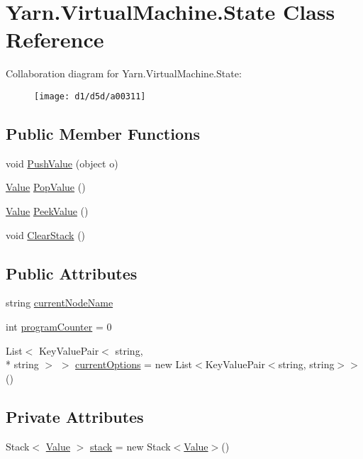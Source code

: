 \hypertarget{a00075}{\section{Yarn.\-Virtual\-Machine.\-State Class Reference}
\label{a00075}
}


Collaboration diagram for Yarn.\-Virtual\-Machine.\-State\-:
\nopagebreak
\begin{figure}[H]
\begin{center}
\leavevmode
\texttt{[image: d1/d5d/a00311]}
\end{center}
\end{figure}
\subsection*{Public Member Functions}
\begin{DoxyCompactItemize}
\item 
void \hyperlink{a00075_aace44f5b85b9f746fede834becda4a8e}{Push\-Value} (object o)
\item 
\hyperlink{a00086}{Value} \hyperlink{a00075_a36881a888ea2839d74c3d4e7c199f4ee}{Pop\-Value} ()
\item 
\hyperlink{a00086}{Value} \hyperlink{a00075_a54fd5b64ec94e937e771846167242dc2}{Peek\-Value} ()
\item 
void \hyperlink{a00075_a9c787097fbbbbf1680e4960cda092535}{Clear\-Stack} ()
\end{DoxyCompactItemize}
\subsection*{Public Attributes}
\begin{DoxyCompactItemize}
\item 
string \hyperlink{a00075_a86f481fad527f719b49f8fee6ff79764}{current\-Node\-Name}
\item 
int \hyperlink{a00075_a2c76546b54b4fb573d7f14d79ce230a3}{program\-Counter} = 0
\item 
List$<$ Key\-Value\-Pair$<$ string, \\*
string $>$ $>$ \hyperlink{a00075_ab816dfea32ecda23282700f01454e0a9}{current\-Options} = new List$<$Key\-Value\-Pair$<$string, string$>$$>$()
\end{DoxyCompactItemize}
\subsection*{Private Attributes}
\begin{DoxyCompactItemize}
\item 
Stack$<$ \hyperlink{a00086}{Value} $>$ \hyperlink{a00075_a0bc84abf38b3ff31cbb47363b851c233}{stack} = new Stack$<$\hyperlink{a00086}{Value}$>$()
\end{DoxyCompactItemize}



